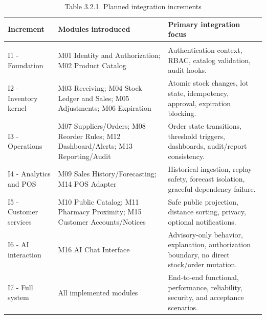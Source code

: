 {\def\LTcaptype{none} %
\begin{longtable}[]{|
  >{\raggedright\arraybackslash}m{}|
  >{\raggedright\arraybackslash}m{}|
  >{\raggedright\arraybackslash}m{}|}
\hline
\begin{minipage}[c]{\linewidth}\raggedright
\textbf{Increment}
\end{minipage} & \begin{minipage}[c]{\linewidth}\raggedright
\textbf{Modules introduced}
\end{minipage} & \begin{minipage}[c]{\linewidth}\raggedright
\textbf{Primary integration focus}
\end{minipage} \\
\hline
\endhead

\caption*{Table 3.2.1. Planned integration increments}\\
\endlastfoot
I1 - Foundation & M01 Identity and Authorization; M02 Product Catalog & Authentication context, RBAC, catalog validation, audit hooks. \\ \hline
I2 - Inventory kernel & M03 Receiving; M04 Stock Ledger and Sales; M05 Adjustments; M06 Expiration & Atomic stock changes, lot state, idempotency, approval, expiration blocking. \\ \hline
I3 - Operations & M07 Suppliers/Orders; M08 Reorder Rules; M12 Dashboard/Alerts; M13 Reporting/Audit & Order state transitions, threshold triggers, dashboards, audit/report consistency. \\ \hline
I4 - Analytics and POS & M09 Sales History/Forecasting; M14 POS Adapter & Historical ingestion, replay safety, forecast isolation, graceful dependency failure. \\ \hline
I5 - Customer services & M10 Public Catalog; M11 Pharmacy Proximity; M15 Customer Accounts/Notices & Safe public projection, distance sorting, privacy, optional notifications. \\ \hline
I6 - AI interaction & M16 AI Chat Interface & Advisory-only behavior, explanation, authorization boundary, no direct stock/order mutation. \\ \hline
I7 - Full system & All implemented modules & End-to-end functional, performance, reliability, security, and acceptance scenarios. \\ \hline
\end{longtable}
}

